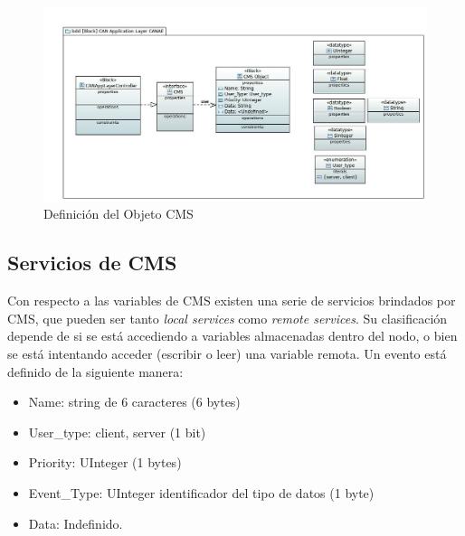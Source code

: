 \begin{figure}[h!]
 \centering
 \includegraphics[scale=0.4]{images/Secciones/AppendixA/CMSObject.JPG}
  \caption{Definición del Objeto CMS}
\label{fig:CMSObject}
\end{figure} 

\subsection{Servicios de CMS}
Con respecto a las variables de CMS existen una serie de servicios brindados por CMS, que pueden ser tanto \textit{local services} como \textit{remote services}. Su clasificación depende de si se está accediendo a variables almacenadas dentro del nodo, o bien se está intentando acceder (escribir o leer) una variable remota. Un evento está definido de la siguiente manera:

\begin{itemize}
   \item Name: string de 6 caracteres (6 bytes)
   \item User\_type: {client, server} (1 bit)
   \item Priority: UInteger (1 bytes)
   \item Event\_Type: UInteger identificador del tipo de datos (1 byte)
   \item Data: Indefinido.
\end{itemize}


